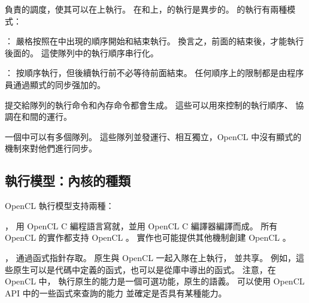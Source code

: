 負責的調度，使其可以在上執行。
在和上，的執行是異步的。
的執行有兩種模式：
\startigBase
\item {}：
嚴格按照在中出現的順序開始和結束執行。
換言之，前面的結束後，才能執行後面的。
這使隊列中的執行順序串行化。

\item {}：
按順序執行，但後續執行前不必等待前面結束。
任何順序上的限制都是由程序員通過顯式的同步强加的。
\stopigBase

提交給隊列的執行命令和內存命令都會生成。
這些可以用來控制的執行順序、
協調在和間的運行。

一個中可以有多個隊列。
這些隊列並發運行、相互獨立，OpenCL 中沒有顯式的機制來對他們進行同步。

\subsection{執行模型：內核的種類}

OpenCL 執行模型支持兩種：
\startigBase
\item {}，
用 OpenCL C 編程語言寫就，並用 OpenCL C 編譯器編譯而成。
所有 OpenCL 的實作都支持 OpenCL 。
實作也可能提供其他機制創建 OpenCL 。

\item {}，
通過函式指針存取。
原生與 OpenCL 一起入隊在上執行，
並共享。
例如，這些原生可以是代碼中定義的函式，也可以是從庫中導出的函式。
注意，在 OpenCL 中，
執行原生的能力是一個可選功能，原生的語義。
可以使用 OpenCL API 中的一些函式來查詢的能力
並確定是否具有某種能力。
\stopigBase

